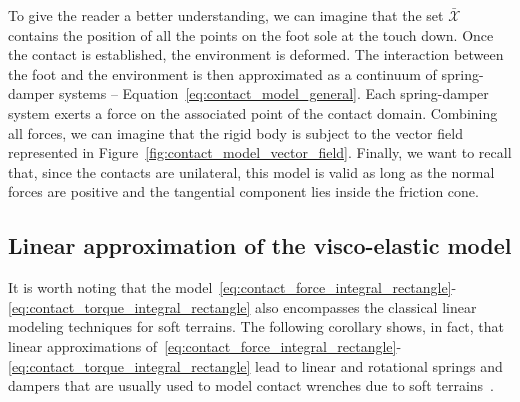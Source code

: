 To give the reader a better understanding, we can imagine that the set $\bar{\mathcal{X}}$ contains the position of all the points on the foot sole at the touch down. Once the contact is established, the environment is deformed. The interaction between the foot and the environment is then approximated as a continuum of spring-damper systems -- Equation~\eqref{eq:contact_model_general}.
Each spring-damper system exerts a force on the associated point of the contact domain. Combining all forces, we can imagine that the rigid body is subject to the vector field represented in Figure~\ref{fig:contact_model_vector_field}. 
Finally, we want to recall that, since the contacts are unilateral, this model is valid as long as the normal forces are positive and the tangential component lies inside the friction cone.

\subsection{Linear approximation of the visco-elastic model}
It is worth noting that the model~\eqref{eq:contact_force_integral_rectangle}-\eqref{eq:contact_torque_integral_rectangle} also encompasses the classical linear modeling techniques for soft terrains. The following corollary shows, in fact, that linear approximations of~\eqref{eq:contact_force_integral_rectangle}-\eqref{eq:contact_torque_integral_rectangle} lead to linear and rotational springs and dampers that are usually used to model contact wrenches due to soft terrains~\cite[Equation~(8)]{Sygulla2020AFootholds:}.
